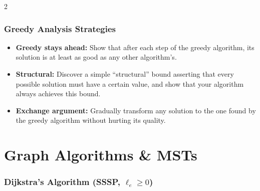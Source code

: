 \documentclass[9pt]{article}
\begin{document}
\begin{multicols}{2}
\subsubsection*{Greedy Analysis Strategies}

\begin{itemize}
  \item \textbf{Greedy stays ahead:} Show that after each step of the greedy algorithm, its solution is at least as good as any other algorithm's.
  \item \textbf{Structural:} Discover a simple ``structural'' bound asserting that every possible solution must have a certain value, and show that your algorithm always achieves this bound.
  \item \textbf{Exchange argument:} Gradually transform any solution to the one found by the greedy algorithm without hurting its quality.
\end{itemize}

\section*{Graph Algorithms \& MSTs}

\subsubsection*{Dijkstra's Algorithm (SSSP, $\ell_e\ge0$)}


\end{multicols}
\end{document}
